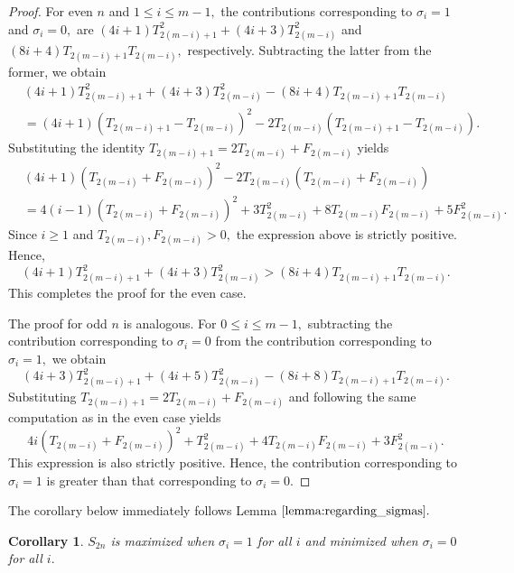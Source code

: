 \documentclass{amsart}
\newtheorem{corollary}[theorem]{Corollary}
\theoremstyle{definition}
\newcommand{\yandi}[1]{\marginpar{\tiny \color{red} Yandi: #1}}
\newcommand{\longnguyen}[1]
{\marginpar{\tiny \color{purple} Long: #1}}
\begin{document}
\begin{proof}
    For even $n$ and $1 \leq i \leq m-1,$ the contributions corresponding to $\sigma_i=1$ and $\sigma_i=0,$ are $(4i+1)T_{2(m-i)+1}^2+(4i+3)T_{2(m-i)}^2$ and $(8i+4)T_{2(m-i)+1}T_{2(m-i)},$ respectively. Subtracting the latter from the former, we obtain
    \begin{align*}&(4i+1)T_{2(m-i)+1}^2+(4i+3)T_{2(m-i)}^2-(8i+4)T_{2(m-i)+1}T_{2(m-i)}\\
    &=(4i+1)(T_{2(m-i)+1}-T_{2(m-i)})^2-2T_{2(m-i)}(T_{2(m-i)+1}-T_{2(m-i)}).
    \end{align*}
    Substituting the identity $T_{2(m-i)+1}=2T_{2(m-i)}+F_{2(m-i)}$ yields
    \begin{align*}&(4i+1)(T_{2(m-i)}+F_{2(m-i)})^2-2T_{2(m-i)}(T_{2(m-i)}+F_{2(m-i)})\\
    &=4(i-1)(T_{2(m-i)}+F_{2(m-i)})^2+3T_{2(m-i)}^2+8T_{2(m-i)}F_{2(m-i)}+5F_{2(m-i)}^2.
    \end{align*}
    Since $i \geq 1$ and $T_{2(m-i)},F_{2(m-i)} > 0,$ the expression above is strictly positive. Hence, 
    \[(4i+1)T_{2(m-i)+1}^2+(4i+3)T_{2(m-i)}^2 > (8i+4)T_{2(m-i)+1}T_{2(m-i)}.\] This completes the proof for the even case.

    The proof for odd $n$ is analogous. For $0 \leq i \leq m-1,$ subtracting the contribution corresponding to $\sigma_i=0$ from the contribution corresponding to $\sigma_i=1,$ we obtain
    \[(4i+3)T_{2(m-i)+1}^2+(4i+5)T_{2(m-i)}^2-(8i+8)T_{2(m-i)+1}T_{2(m-i)}.\]
    Substituting $T_{2(m-i)+1}=2T_{2(m-i)}+F_{2(m-i)}$ and following the same computation as in the even case yields
    \[4i(T_{2(m-i)}+F_{2(m-i)})^2 + T_{2(m-i)}^2 + 4T_{2(m-i)}F_{2(m-i)} + 3F_{2(m-i)}^2.\]
    This expression is also strictly positive. Hence, the contribution corresponding to $\sigma_i=1$ is greater than that corresponding to $\sigma_i=0.$
    \end{proof}


The corollary below immediately follows Lemma $\ref{lemma:regarding_sigmas}.$
\begin{corollary}\label{corollary:maximizeminimize}
    $S_{2n}$ is maximized when $\sigma_i=1$ for all $i$ and minimized when $\sigma_i=0$ for all $i.$ %
\end{corollary}
\end{document}
